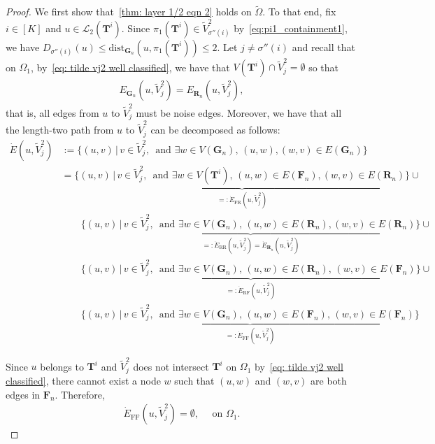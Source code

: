\documentclass[twoside,11pt]{article}
\theoremstyle{remark}
\begin{document}
\begin{proof}
We first show that~\eqref{thm: layer 1/2 eqn 2} holds on $\tilde{\Omega}$. To that end, fix $i \in [K]$ and $u \in \mathcal{L}_2(\bm{T}^i)$. Since $\pi_1(\bm{T}^i) \in \tilde{V}_{\sigma''(i)}^2$ by~\eqref{eq:pi1_containment1}, we have $D_{\sigma''(i)}(u) \leq \text{dist}_{\bm{G}_n}(u, \pi_1(\bm{T}^i)) \leq 2$. Let $j \neq \sigma''(i)$ and recall that on $\Omega_1$, by~\eqref{eq: tilde vj2 well classified}, we have that $V(\bm{T}^i) \cap \tilde{V}^2_j = \emptyset$ so that
\begin{align*}
E_{\bm{G}_n}(u, \tilde{V}_j^2) = E_{\bm{R}_n}(u, \tilde{V}^2_j),
\end{align*}
that is, all edges from $u$ to $\tilde{V}_j^2$ must be noise edges. Moreover, we have that all the length-two path from $u$ to $\tilde{V}_j^2$ can be decomposed as follows:
\begin{align*}
\dot{E}(u, \tilde{V}_j^2) &:= \bigl\{ (u, v) \, \big|\, v \in \tilde{V}_j^2,\, \text{ and } \exists w \in V(\bm{G}_n), \, (u, w), (w, v) \in E(\bm{G}_n) \bigr\} \\
%
&= \underbrace{\bigl\{(u, v) \,\big|\, v \in \tilde{V}_j^2,\, \text{ and } \exists w \in V(\bm{T}^i), \, (u, w)\in E(\bm{F}_n), (w, v) \in E(\bm{R}_n) \bigr\}}_{=: \dot{E}_{\text{FR}}(u, \tilde{V}_j^2)} \cup \\
%
&\qquad \underbrace{\bigl\{(u, v) \,\big|\, v \in \tilde{V}_j^2,\, \text{ and } \exists w \in V(\bm{G}_n), \, (u, w) \in E(\bm{R}_n), (w, v) \in E(\bm{R}_n) \bigr\}}_{=: \dot{E}_{\text{RR}}(u, \tilde{V}_j^2) = \dot{E}_{\bm{R}_n}(u, \tilde{V}_j^2)} \cup \\
%
&\qquad \underbrace{\bigl\{(u, v) \,\big|\, v \in \tilde{V}_j^2,\, \text{ and } \exists w \in V(\bm{G}_n), \,(u, w) \in E(\bm{R}_n),\, (w, v) \in E(\bm{F}_n) \bigr \}}_{=: \dot{E}_{\text{RF}}(u, \tilde{V}_j^2)} \cup \\
%
&\qquad \underbrace{\bigl\{(u, v) \,\big|\, v \in \tilde{V}_j^2,\, \text{ and } \exists w \in V(\bm{G}_n), \,(u, w) \in E(\bm{F}_n),\, (w, v) \in E(\bm{F}_n) \bigr \}}_{=: \dot{E}_{\text{FF}}(u, \tilde{V}_j^2)}
\end{align*}

Since $u$ belongs to $\bm{T}^i$ and $\tilde{V}_j^2$ does not intersect $\bm{T}^i$ on $\Omega_1$ by~\eqref{eq: tilde vj2 well classified}, there cannot exist a node $w$ such that $(u, w)$ and $(w, v)$ are both edges in $\bm{F}_n$. Therefore,
\begin{align}
\dot{E}_{\text{FF}}(u, \tilde{V}_j^2) = \emptyset, \quad \text{ on } \Omega_1.
\end{align}


\end{proof}
\end{document}
